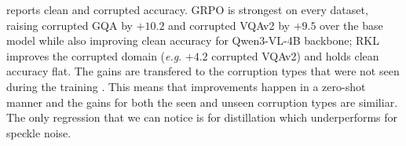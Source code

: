 \documentclass[10pt,twocolumn,letterpaper]{article}
\makeatletter
\providecommand{\eg}{\textit{e.g}.\@\xspace}
\makeatother
\begin{document}
 reports clean and corrupted accuracy. GRPO is strongest on every
dataset, raising corrupted GQA by $+10.2$ and corrupted VQAv2 by $+9.5$ over the base
model while also improving clean accuracy for Qwen3-VL-4B backbone; RKL improves the corrupted domain (\eg
$+4.2$ corrupted VQAv2) and holds clean accuracy flat. The gains are transfered to the corruption types that were not seen during the training . This means that improvements happen in a zero-shot manner and the gains for both the seen and unseen corruption types are similiar. The only regression that we can notice is for distillation which underperforms for speckle noise.  
\end{document}
